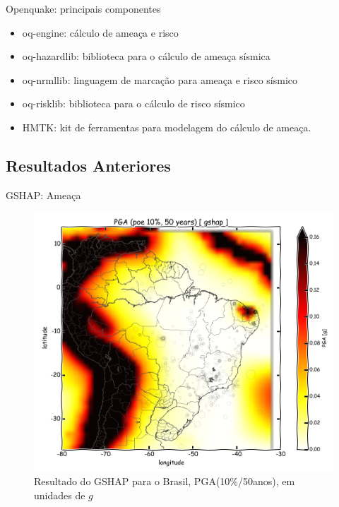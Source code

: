\documentclass[ucs,8pt]{beamer}
\begin{document}
\begin{frame}{Openquake: principais componentes}
\begin{itemize}
  \item oq-engine: cálculo de ameaça e risco
  \item oq-hazardlib: biblioteca para o cálculo de ameaça sísmica
  \item oq-nrmllib: linguagem de marcação para ameaça e risco sísmico
  \item oq-risklib: biblioteca para o cálculo de risco sísmico
  \item \alert{HMTK}: kit de ferramentas para modelagem do cálculo de ameaça.
\end{itemize}
\end{frame}



\subsection{Resultados Anteriores}
\begin{frame}{GSHAP: Ameaça}
\begin{figure}[H]
  \centering
  \includegraphics[height=.95\textheight]{pga_gshap} 
  \caption{Resultado do GSHAP para o Brasil, PGA(10\%/50anos), em unidades de $g$}
  \label{fig:gshap} 
\end{figure}
\end{frame}
\end{document}
